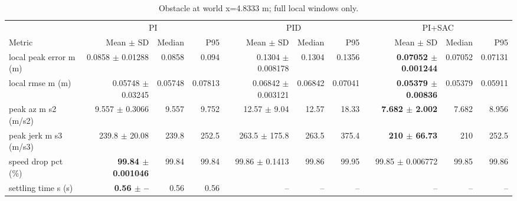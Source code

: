 \begin{table}[t]
\centering
\scriptsize
\caption{Obstacle at world x=4.8333 m; full local windows only.}
\label{tab:obstacle-8}
\begin{tabular}{p{}*{9}{r}}
\toprule
 & \multicolumn{3}{c}{PI} & \multicolumn{3}{c}{PID} & \multicolumn{3}{c}{PI+SAC} \\
\cmidrule(lr){2-4}\cmidrule(lr){5-7}\cmidrule(lr){8-10}
Metric & Mean $\pm$ SD & Median & P95 & Mean $\pm$ SD & Median & P95 & Mean $\pm$ SD & Median & P95 \\
\midrule
local peak error m (m) & 0.0858 $\pm$ 0.01288 & 0.0858 & 0.094 & 0.1304 $\pm$ 0.008178 & 0.1304 & 0.1356 & \textbf{0.07052 $\pm$ 0.001244} & 0.07052 & 0.07131 \\
local rmse m (m) & 0.05748 $\pm$ 0.03245 & 0.05748 & 0.07813 & 0.06842 $\pm$ 0.003121 & 0.06842 & 0.07041 & \textbf{0.05379 $\pm$ 0.00836} & 0.05379 & 0.05911 \\
peak az m s2 (m/s2) & 9.557 $\pm$ 0.3066 & 9.557 & 9.752 & 12.57 $\pm$ 9.04 & 12.57 & 18.33 & \textbf{7.682 $\pm$ 2.002} & 7.682 & 8.956 \\
peak jerk m s3 (m/s3) & 239.8 $\pm$ 20.08 & 239.8 & 252.5 & 263.5 $\pm$ 175.8 & 263.5 & 375.4 & \textbf{210 $\pm$ 66.73} & 210 & 252.5 \\
speed drop pct (\%) & \textbf{99.84 $\pm$ 0.001046} & 99.84 & 99.84 & 99.86 $\pm$ 0.1413 & 99.86 & 99.95 & 99.85 $\pm$ 0.006772 & 99.85 & 99.86 \\
settling time s (s) & \textbf{0.56 $\pm$ --} & 0.56 & 0.56 & -- & -- & -- & -- & -- & -- \\
\bottomrule
\end{tabular}
\end{table}
